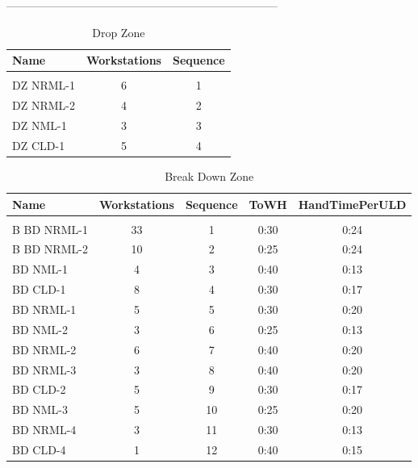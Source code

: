\documentclass[11pt,a4paper,fleqn]{article}
\begin{document}
------------------------------------------------------------------------

\pagebreak

\begin{table}[h!]
  \begin{center}
    \caption{Drop Zone}
    \label{tab:table1}
    \begin{tabular}{l|c|c} %
      \textbf{Name} & \textbf{Workstations} & \textbf{Sequence}\\
      \hline
       & & \\
      DZ NRML-1 & 6 & 1\\
      DZ NRML-2 & 4 & 2\\
      DZ NML-1 & 3 & 3\\
      DZ CLD-1 & 5 & 4\\
    \end{tabular}
  \end{center}
\end{table}

\begin{table}[h!]
  \begin{center}
    \caption{Break Down Zone}
    \label{tab:table1}
    \begin{tabular}{l|c|c|c|c} %
      \textbf{Name} & \textbf{Workstations} & \textbf{Sequence} & \textbf{ToWH} & \textbf{HandTimePerULD}\\
      \hline
       & & & & \\
      B BD NRML-1 & 33 & 1 & 0:30 & 0:24\\
      B BD NRML-2 & 10 & 2 &  0:25 & 0:24\\
      BD NML-1 & 4 & 3 &  0:40 & 0:13\\
      BD CLD-1 & 8 & 4  &  0:30 & 0:17\\
      BD NRML-1 & 5 & 5  &  0:30 & 0:20\\
      BD NML-2 & 3 & 6  & 0:25 & 0:13\\
      BD NRML-2 & 6 & 7  & 0:40 & 0:20\\
      BD NRML-3 & 3 & 8  & 0:40 & 0:20\\
      BD CLD-2 & 5 & 9  & 0:30 & 0:17\\
      BD NML-3 & 5 & 10  & 0:25 & 0:20\\
      BD NRML-4 & 3 & 11  & 0:30 & 0:13\\
      BD CLD-4 & 1 & 12  & 0:40 & 0:15\\
    \end{tabular}
  \end{center}
\end{table}
\end{document}
